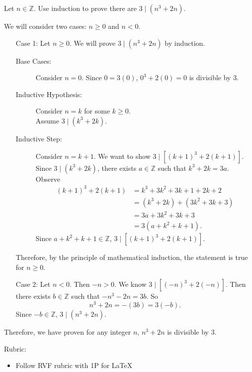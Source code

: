 \documentclass{article}
\newcommand{\Z}{\mathbb{Z}}
\theoremstyle{definition}
\begin{document}
\begin{question}
    Let $n\in \Z$. Use induction to prove there are $3 \mid (n^3+2n)$. 
\end{question}
\begin{solution}
        We will consider two cases: $n\geq 0$ and $n<0$.
    \begin{itemize}
        \item[Case 1:] Let $n\geq 0$. We will prove $3 \mid (n^3+2n)$ by induction.
	\begin{description}
	\item[Base Cases: ] Consider $n=0$. Since $0=3(0)$, $0^3+2(0)=0$ is divisible by 3.
	
	\item[Inductive Hypothesis: ] Consider $n=k$ for some $k\geq 0$.\\ Assume $3 \mid (k^3+2k)$.
	
	\item[Inductive Step: ] Consider $n=k+1$. We want to show $3\mid [(k+1)^3+2(k+1)]$. Since $3 \mid (k^3+2k)$, there exists $a\in \Z$ such that $k^3+2k=3a$. Observe
 \begin{align*}
     (k+1)^3 + 2(k+1) &= k^3+3k^2+3k+1 + 2k +2\\
     &= (k^3+2k) + (3k^2+3k+3)\\
     &= 3a + 3k^2+3k+3\\
     & = 3 (a + k^2+k+1).
 \end{align*}
 Since $a + k^2+k+1\in \Z$, $3\mid [(k+1)^3+2(k+1)]$.
	\end{description}
	Therefore, by the principle of mathematical induction, the statement is true for $n\geq 0$.

 \item[Case 2:] Let $n<0$. Then $-n>0$. We know $3 \mid [(-n)^3+2(-n)]$. Then there exists $b\in \Z$ such that $-n^3-2n=3b$. So 
 \[
 n^3+2n = -(3b) = 3 (-b).
 \]
 Since $-b\in\Z$, $3\mid (n^3+2n)$.

 \end{itemize}

 Therefore, we have proven for any integer $n$, $n^3+2n$ is divisible by 3.
	
{\color{red} Rubric:
\begin{itemize}
\item Follow RVF rubric with 1P for \LaTeX
\end{itemize}}
\end{solution}
\end{document}
